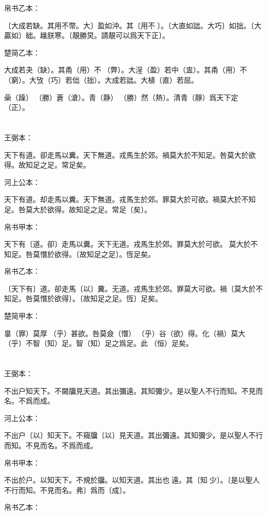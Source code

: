 \documentclass[a5paper]{ctexbook}
\begin{document}
    帛书乙本：

    〔大成若缺。其用不幣。大〕盈如沖。其〔用不𡩫〕。〔大直如詘。大巧〕如拙。〔大贏如〕絀。趮朕寒。〔靚勝炅。請靚可以爲天下正〕。

    楚简乙本：

    大成若夬（缺）。其甬（用）不󶵢（弊）。大浧（盈）若中（盅）。其甬（用）不󶵣（窮）。大攷（巧）若㑁（拙）。大成若詘。大植（直）若屈。

    喿（躁）󼡲（勝）蒼（滄）。青（静）󼡲（勝）然（熱）。清青（靜）爲天下定（正）。

    \chapter{}
    王弼本：

    天下有道。卻走馬以糞。天下無道。戎馬生於郊。禍莫大於不知足。咎莫大於欲得。故知足之足。常足矣。

    河上公本：

    天下有道。却走馬以糞。天下無道。戎馬生於郊。罪莫大於可欲。禍莫大於不知足。咎莫大於欲得。故知足之足。常足〔矣〕。

    帛书甲本：

    天下有〔道。卻〕走馬以糞。天下无道。戎馬生於郊。罪莫大於可欲。𢢸莫大於不知足。咎莫憯於欲得。〔故知足之足〕。恆足矣。

    帛书乙本：

    〔天下有〕道。卻走馬〔以〕糞。无道。戎馬生於郊。罪莫大可欲。禍〔莫大於不知足。咎莫憯於欲得〕。〔故知足之足。恆〕足矣。

    楚简甲本：

    辠（罪）莫厚󶴋（乎）甚欲。咎莫僉（憯）󶴋（乎）谷（欲）得。化（禍）莫大󶴋（乎）不智（知）足。智（知）足之爲足。此𠄨（恒）足矣。

    \chapter{}
    王弼本：

    不出户知天下。不闚牖見天道。其出彌遠。其知彌少。是以聖人不行而知。不見而名。不爲而成。

    河上公本：

    不出户〔以〕知天下。不窺牖〔以〕見天道。其出彌遠。其知彌少。是以聖人不行而知。不見而名。不爲而成。

    帛书甲本：

    不出於户。以知天下。不規於牖。以知天道。其出也𢑃遠。其〔知󱁁少〕。〔是以聖人不行而知。不見而名。弗〕爲而〔成〕。

    帛书乙本：
\end{document}

